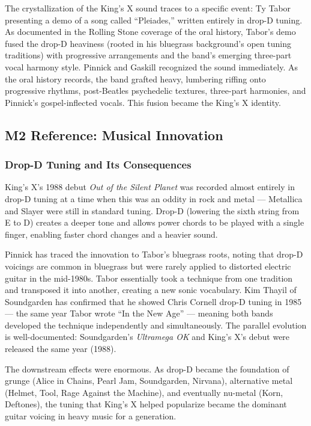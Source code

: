 \documentclass[11pt,letterpaper]{article}
\begin{document}
The crystallization of the King's X sound traces to a specific event: Ty Tabor presenting a demo of a song called ``Pleiades,'' written entirely in drop-D tuning. As documented in the Rolling Stone coverage of the oral history, Tabor's demo fused the drop-D heaviness (rooted in his bluegrass background's open tuning traditions) with progressive arrangements and the band's emerging three-part vocal harmony style. Pinnick and Gaskill recognized the sound immediately. As the oral history records, the band grafted heavy, lumbering riffing onto progressive rhythms, post-Beatles psychedelic textures, three-part harmonies, and Pinnick's gospel-inflected vocals. This fusion became the King's X identity.

\subsection{M2 Reference: Musical Innovation}

\subsubsection{Drop-D Tuning and Its Consequences}

King's X's 1988 debut \textit{Out of the Silent Planet} was recorded almost entirely in drop-D tuning at a time when this was an oddity in rock and metal --- Metallica and Slayer were still in standard tuning. Drop-D (lowering the sixth string from E to D) creates a deeper tone and allows power chords to be played with a single finger, enabling faster chord changes and a heavier sound.

Pinnick has traced the innovation to Tabor's bluegrass roots, noting that drop-D voicings are common in bluegrass but were rarely applied to distorted electric guitar in the mid-1980s. Tabor essentially took a technique from one tradition and transposed it into another, creating a new sonic vocabulary. Kim Thayil of Soundgarden has confirmed that he showed Chris Cornell drop-D tuning in 1985 --- the same year Tabor wrote ``In the New Age'' --- meaning both bands developed the technique independently and simultaneously. The parallel evolution is well-documented: Soundgarden's \textit{Ultramega OK} and King's X's debut were released the same year (1988).

The downstream effects were enormous. As drop-D became the foundation of grunge (Alice in Chains, Pearl Jam, Soundgarden, Nirvana), alternative metal (Helmet, Tool, Rage Against the Machine), and eventually nu-metal (Korn, Deftones), the tuning that King's X helped popularize became the dominant guitar voicing in heavy music for a generation.
\end{document}
